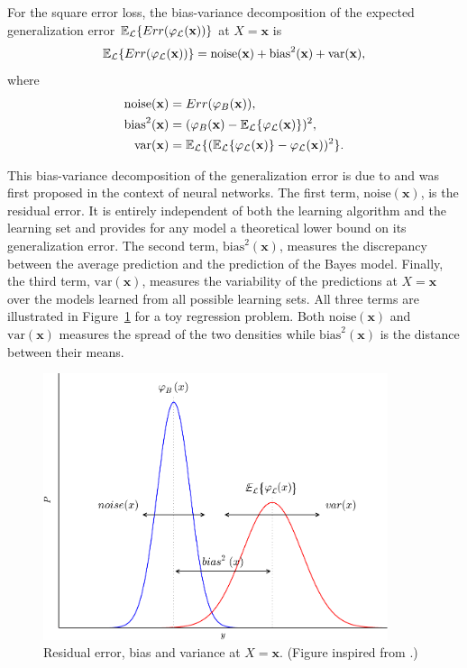\begin{theorem}\label{thm:bias-variance}
For the square error loss, the bias-variance decomposition of the expected
generalization error $\mathbb{E}_{\cal L} \{ Err(\varphi_{\cal L}(\mathbf{x}))
\}$ at $X=\mathbf{x}$ is
\begin{equation}
\mathbb{E}_{\cal L} \{ Err(\varphi_{\cal L}(\mathbf{x})) \} = \text{noise}(\mathbf{x}) + \text{bias}^2(\mathbf{x}) + \text{var}(\mathbf{x}),
\end{equation}
where
\begin{align}
\text{noise}(\mathbf{x}) &= Err(\varphi_B(\mathbf{x})), \\
\text{bias}^2(\mathbf{x}) &= (\varphi_B(\mathbf{x}) - \mathbb{E}_{\cal L} \{ \varphi_{\cal L}(\mathbf{x}) \} )^2, \\
\text{var}(\mathbf{x}) &= \mathbb{E}_{\cal L} \{ (\mathbb{E}_{\cal L} \{ \varphi_{\cal L}(\mathbf{x}) \} - \varphi_{\cal L}(\mathbf{x}))^2 \}.
\end{align}
\end{theorem}

This bias-variance decomposition of the generalization error is due to
\citet{geman:1992} and was first proposed in the context of neural networks.
The first term, $\text{noise}(\mathbf{x})$, is the residual error. It is
entirely independent of both the learning algorithm and the learning set and
provides for any model a theoretical lower bound on its generalization error.
The second term, $\text{bias}^2(\mathbf{x})$, measures the discrepancy between
the average prediction and the prediction of the Bayes model. Finally, the
third term, $\text{var}(\mathbf{x})$, measures the variability of the
predictions at $X=\mathbf{x}$ over the models learned from all possible
learning sets. All three terms are illustrated in Figure~\ref{fig:bias-variance}
for a toy regression problem. Both $\text{noise}(\mathbf{x})$ and
$\text{var}(\mathbf{x})$ measures the spread of the two densities while
$\text{bias}^2(\mathbf{x})$ is the distance between their means.

\begin{figure}
    \centering
    \includegraphics[width=0.9\textwidth]{figures/ch4_bias_variance.pdf}
    \caption{Residual error, bias and variance at $X=\mathbf{x}$. (Figure inspired from \citep{geurts:2002}.)}
    \label{fig:bias-variance}
\end{figure}

